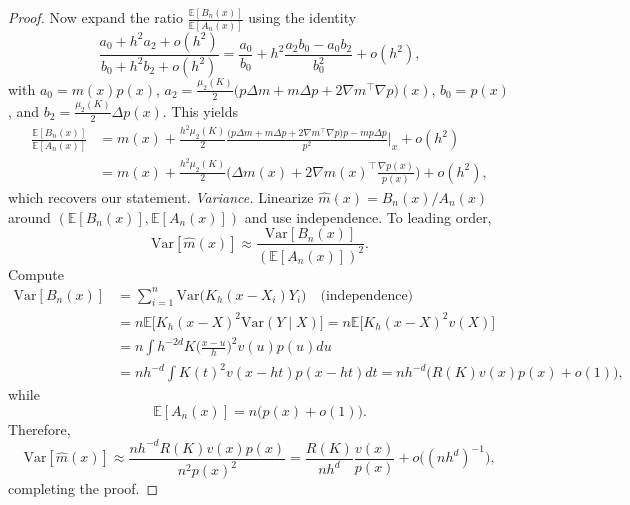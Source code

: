 \begin{proof}
Now expand the ratio $\frac{\mathbb{E}[B_n(x)]}{\mathbb{E}[A_n(x)]}$ using the identity
\[
\frac{a_0+h^2 a_2+o(h^2)}{b_0+h^2 b_2+o(h^2)}
=\frac{a_0}{b_0}
+h^2\frac{a_2 b_0-a_0 b_2}{b_0^2}
+o(h^2),
\]
with $a_0=m(x)p(x)$, $a_2=\frac{\mu_2(K)}{2}\big(p\Delta m + m\Delta p + 2\nabla m^\top \nabla p\big)(x)$, $b_0=p(x)$, and $b_2=\frac{\mu_2(K)}{2}\Delta p(x)$. This yields
\begin{align*}
\frac{\mathbb{E}[B_n(x)]}{\mathbb{E}[A_n(x)]}
&=m(x)
+\frac{h^2\mu_2(K)}{2}\frac{\big(p\Delta m + m\Delta p + 2\nabla m^\top \nabla p\big)p - m p\Delta p}{p^2}\Big|_{x}+o(h^2)\\
&=m(x)
+\frac{h^2\mu_2(K)}{2}\Big(\Delta m(x)+2\nabla m(x)^\top \frac{\nabla p(x)}{p(x)}\Big)+o(h^2),
\end{align*}
which recovers our statement.
\emph{Variance.} Linearize $\widehat m(x)=B_n(x)/A_n(x)$ around $(\mathbb{E}[B_n(x)],\mathbb{E}[A_n(x)])$ and use independence. To leading order,
\[
\mathrm{Var}[\widehat m(x)]\approx \frac{\mathrm{Var}[B_n(x)]}{(\mathbb{E}[A_n(x)])^2}.
\]
Compute
\begin{align*}
\mathrm{Var}[B_n(x)]
&= \sum_{i=1}^n \mathrm{Var}\big(K_h(x-X_i)Y_i\big)\quad\text{(independence)}\\
&= n\mathbb{E}\big[K_h(x-X)^2\mathrm{Var}(Y\mid X)\big]
= n\mathbb{E}\big[K_h(x-X)^2v(X)\big]\\
&= n\int h^{-2d}K\Big(\frac{x-u}{h}\Big)^2 v(u)p(u)du\\
&= n h^{-d}\int K(t)^2v(x-h t)p(x-h t)dt
= n h^{-d}\Big(R(K)v(x)p(x)+o(1)\Big),
\end{align*}
while
\[
\mathbb{E}[A_n(x)]=n\big(p(x)+o(1)\big).
\]
Therefore,
\[
\mathrm{Var}[\widehat m(x)]
\approx \frac{n h^{-d}R(K)v(x)p(x)}{n^2p(x)^2}
=\frac{R(K)}{n h^d}\frac{v(x)}{p(x)}+o\big((n h^d)^{-1}\big),
\]
completing the proof.
\end{proof}

